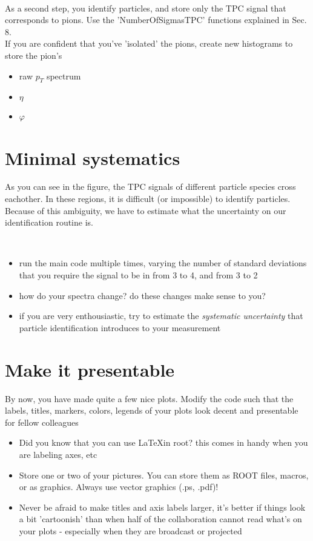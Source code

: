\documentclass{article}
\begin{document}
\\ 


As a second step, you identify particles, and store only the TPC signal that corresponds to pions. Use the 'NumberOfSigmasTPC' functions explained in Sec. 8. 
\\


If you are confident that you've 'isolated' the pions, create new histograms to store the pion's
\begin{itemize}
\item raw $p_{T}$ spectrum
\item $\eta$
\item $\varphi$
\end{itemize}

\section{Minimal systematics}

As you can see in the figure, the TPC signals of different particle species cross eachother. In these regions, it is difficult (or impossible) to identify particles. Because of this ambiguity, we have to estimate what the uncertainty on our identification routine is. 

\\


\begin{itemize}
\item run the main code multiple times, varying the number of standard deviations that you require the signal to be in from 3 to 4, and from 3 to 2
\item how do your spectra change? do these changes make sense to you?
\item if you are very enthousiastic, try to estimate the \emph{systematic uncertainty} that particle identification introduces to your measurement
\end{itemize}


\section{Make it presentable}

By now, you have made quite a few nice plots. Modify the code such that the labels, titles, markers, colors, legends of your plots look decent and presentable for fellow colleagues
\begin{itemize}
\item Did you know that you can use \LaTeX in root? this comes in handy when you are labeling axes, etc
\item Store one or two of your pictures. You can store them as ROOT files, macros, or as graphics. Always use vector graphics (.ps, .pdf)! 
\item Never be afraid to make titles and axis labels larger, it's better if things look a bit 'cartoonish' than when half of the collaboration cannot read what's on your plots - especially when they are broadcast or projected
\end{itemize}
\end{document}
